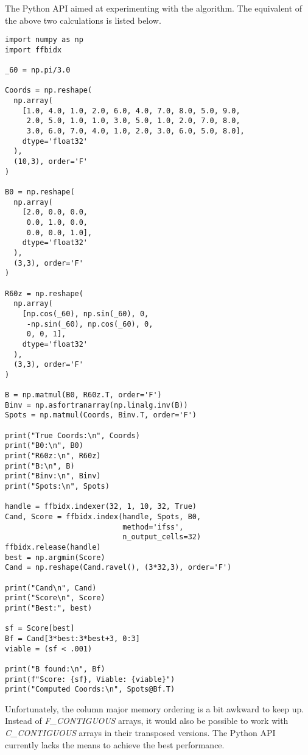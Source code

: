 \documentclass[a4paper,10pt]{article}
\begin{document}
The Python API aimed at experimenting with the algorithm. The equivalent of the above two calculations is listed below.
%
\begin{lstlisting}
import numpy as np
import ffbidx

_60 = np.pi/3.0

Coords = np.reshape(
  np.array(
    [1.0, 4.0, 1.0, 2.0, 6.0, 4.0, 7.0, 8.0, 5.0, 9.0,
     2.0, 5.0, 1.0, 1.0, 3.0, 5.0, 1.0, 2.0, 7.0, 8.0,
     3.0, 6.0, 7.0, 4.0, 1.0, 2.0, 3.0, 6.0, 5.0, 8.0],
    dtype='float32'
  ),
  (10,3), order='F'
)

B0 = np.reshape(
  np.array(
    [2.0, 0.0, 0.0,
     0.0, 1.0, 0.0,
     0.0, 0.0, 1.0],
    dtype='float32'
  ),
  (3,3), order='F'
)

R60z = np.reshape(
  np.array(
    [np.cos(_60), np.sin(_60), 0,
     -np.sin(_60), np.cos(_60), 0,
     0, 0, 1],
    dtype='float32'
  ),
  (3,3), order='F'
)

B = np.matmul(B0, R60z.T, order='F')
Binv = np.asfortranarray(np.linalg.inv(B))
Spots = np.matmul(Coords, Binv.T, order='F')

print("True Coords:\n", Coords)
print("B0:\n", B0)
print("R60z:\n", R60z)
print("B:\n", B)
print("Binv:\n", Binv)
print("Spots:\n", Spots)

handle = ffbidx.indexer(32, 1, 10, 32, True)
Cand, Score = ffbidx.index(handle, Spots, B0,
                           method='ifss',
                           n_output_cells=32)
ffbidx.release(handle)
best = np.argmin(Score)
Cand = np.reshape(Cand.ravel(), (3*32,3), order='F')

print("Cand\n", Cand)
print("Score\n", Score)
print("Best:", best)

sf = Score[best]
Bf = Cand[3*best:3*best+3, 0:3]
viable = (sf < .001)

print("B found:\n", Bf)
print(f"Score: {sf}, Viable: {viable}")
print("Computed Coords:\n", Spots@Bf.T)
\end{lstlisting}
%
Unfortunately, the column major memory ordering is a bit awkward to keep up. Instead of \emph{F\_CONTIGUOUS} arrays, it would also be possible to work with \emph{C\_CONTIGUOUS} arrays in their transposed versions. The Python API currently lacks the means to achieve the best performance.

\printbibliography
\end{document}
